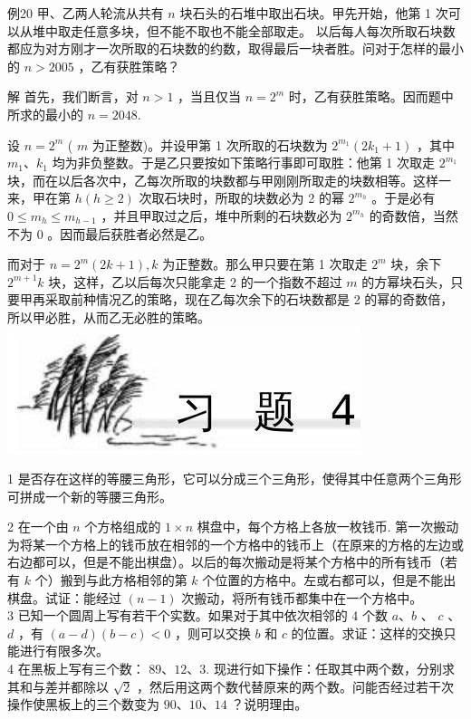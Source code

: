 \documentclass[10pt]{article}
\begin{document}
例20 甲、乙两人轮流从共有 $n$ 块石头的石堆中取出石块。甲先开始，他第 1 次可以从堆中取走任意多块，但不能不取也不能全部取走。 以后每人每次所取石块数都应为对方刚才一次所取的石块数的约数，取得最后一块者胜。问对于怎样的最小的 $n>2005$ ，乙有获胜策略？

解 首先，我们断言，对 $n>1$ ，当且仅当 $n=2^{m}$ 时，乙有获胜策略。因而题中所求的最小的 $n=2048$.

设 $n=2^{m}$ ( $m$ 为正整数)。并设甲第 1 次所取的石块数为 $2^{m_{1}}\left(2 k_{1}+1\right)$ ，其中 $m_{1} 、 k_{1}$ 均为非负整数。于是乙只要按如下策略行事即可取胜：他第 1 次取走 $2^{m_{1}}$ 块，而在以后各次中，乙每次所取的块数都与甲刚刚所取走的块数相等。这样一来，甲在第 $h(h \geqslant 2)$ 次取石块时，所取的块数必为 2 的幂 $2^{m_{h}}$ 。于是必有 $0 \leqslant m_{h} \leqslant m_{h-1}$ ，并且甲取过之后，堆中所剩的石块数必为 $2^{m_{h}}$ 的奇数倍，当然不为 0 。因而最后获胜者必然是乙。

而对于 $n=2^{m}(2 k+1), k$ 为正整数。那么甲只要在第 1 次取走 $2^{m}$ 块，余下 $2^{m+1} k$ 块，这样，乙以后每次只能拿走 2 的一个指数不超过 $m$ 的方幂块石头，只要甲再采取前种情况乙的策略，现在乙每次余下的石块数都是 2 的幂的奇数倍，所以甲必胜，从而乙无必胜的策略。\\
\includegraphics[max width=\textwidth, center]{2024_10_09_bce9f07034ef55fc9c97g-51}

1 是否存在这样的等腰三角形，它可以分成三个三角形，使得其中任意两个三角形可拼成一个新的等腰三角形。

2 在一个由 $n$ 个方格组成的 $1 \times n$ 棋盘中，每个方格上各放一枚钱币. 第一次搬动为将某一个方格上的钱币放在相邻的一个方格中的钱币上（在原来的方格的左边或右边都可以，但是不能出棋盘）。以后的每次搬动是将某个方格中的所有钱币（若有 $k$ 个）搬到与此方格相邻的第 $k$ 个位置的方格中。左或右都可以，但是不能出棋盘。试证：能经过 $(n-1)$ 次搬动，将所有钱币都集中在一个方格中。\\
3 已知一个圆周上写有若干个实数。如果对于其中依次相邻的 4 个数 $a 、 b$ 、 $c$ 、 $d$ ，有 $(a-d)(b-c)<0$ ，则可以交换 $b$ 和 $c$ 的位置。求证：这样的交换只能进行有限多次。\\
4 在黑板上写有三个数： $89 、 12 、 3$. 现进行如下操作：任取其中两个数，分别求其和与差并都除以 $\sqrt{2}$ ，然后用这两个数代替原来的两个数。问能否经过若干次操作使黑板上的三个数变为 $90 、 10 、 14$ ？说明理由。
\end{document}
